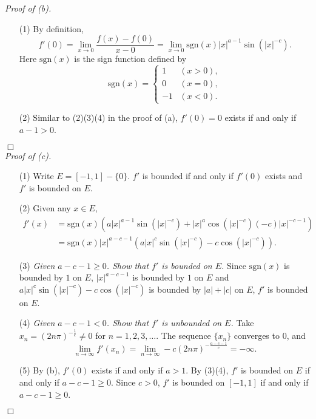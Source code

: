\documentclass{article}
\begin{document}
\emph{Proof of (b).}
\begin{enumerate}
  \item[(1)]
  By definition,
  \[
    f'(0)
    = \lim_{x \to 0} \frac{f(x) - f(0)}{x - 0}
    = \lim_{x \to 0} \mathrm{sgn}(x) |x|^{a-1} \sin{(|x|^{-c})}.
  \]
  Here $\mathrm{sgn}(x)$ is the sign function defined by
  \begin{equation*}
  \mathrm{sgn}(x) =
    \begin{cases}
      1 & (x > 0), \\
      0 & (x = 0), \\
      -1 & (x < 0).
    \end{cases}
  \end{equation*}

  \item[(2)]
  Similar to (2)(3)(4) in the proof of (a),
  $f'(0) = 0$ exists if and only if $a - 1 > 0$.
\end{enumerate}
$\Box$ \\



\emph{Proof of (c).}
\begin{enumerate}
  \item[(1)]
  Write $E = [-1,1] - \{0\}$.
  $f'$ is bounded if and only if $f'(0)$ exists and $f'$ is bounded on $E$.

  \item[(2)]
  Given any $x \in E$,
  \begin{align*}
    f'(x)
    &= \mathrm{sgn}(x)\left( a|x|^{a-1} \sin(|x|^{-c}) + |x|^a \cos(|x|^{-c})(-c)|x|^{-c-1} \right) \\
    &= \mathrm{sgn}(x)|x|^{a-c-1} \left( a|x|^{c}\sin(|x|^{-c}) - c\cos(|x|^{-c}) \right).
  \end{align*}

  \item[(3)]
  \emph{Given $a-c-1 \geq 0$.
  Show that $f'$ is bounded on $E$.}
  Since $\mathrm{sgn}(x)$ is bounded by $1$ on $E$,
  $|x|^{a-c-1}$ is bounded by $1$ on $E$ and
  $a|x|^{c}\sin(|x|^{-c}) - c\cos(|x|^{-c})$ is bounded by $|a|+|c|$ on $E$,
  $f'$ is bounded on $E$.

  \item[(4)]
  \emph{Given $a-c-1 < 0$.
  Show that $f'$ is unbounded on $E$.}
  Take $x_n = \left( 2n\pi \right)^{-\frac{1}{c}} \neq 0$
  for $n = 1, 2, 3, \ldots$.
  The sequence $\{ x_n \}$ converges to $0$, and
  \[
    \lim_{n \to \infty} f'(x_n)
    = \lim_{n \to \infty} -c (2n\pi)^{-\frac{a-c-1}{c}}
    = -\infty.
  \]

  \item[(5)]
  By (b), $f'(0)$ exists if and only if $a > 1$.
  By (3)(4), $f'$ is bounded on $E$ if and only if $a-c-1 \geq 0$.
  Since $c > 0$, $f'$ is bounded on $[-1,1]$ if and only if $a-c-1 \geq 0$.
\end{enumerate}
$\Box$ \\
\end{document}
